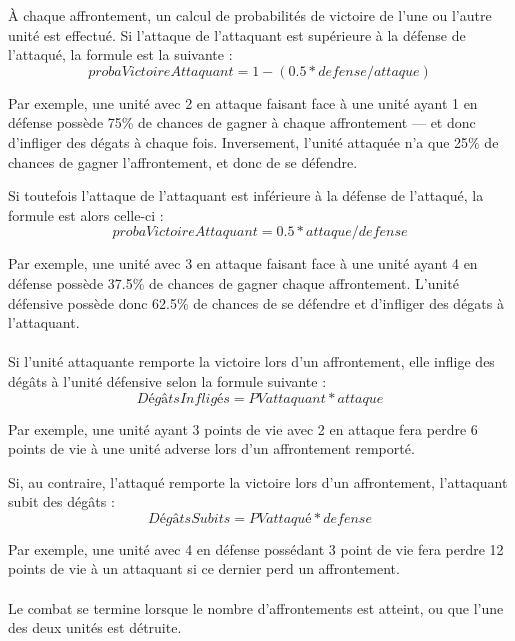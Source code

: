 	À chaque affrontement, un calcul de probabilités de victoire de l'une ou l'autre unité est effectué. Si l'attaque de l'attaquant est supérieure à la défense de l'attaqué, la formule est la suivante :
	\[ probaVictoireAttaquant = 1-(0.5*defense/attaque) \]
	
	Par exemple, une unité avec 2 en attaque faisant face à une unité ayant 1 en défense possède 75\% de chances de gagner à chaque affrontement --- et donc d'infliger des dégats à chaque fois. Inversement, l'unité attaquée n'a que 25\% de chances de gagner l'affrontement, et donc de se défendre.
	
	Si toutefois l'attaque de l'attaquant est inférieure à la défense de l'attaqué, la formule est alors celle-ci :
	\[ probaVictoireAttaquant = 0.5*attaque/defense \]

	Par exemple, une unité avec 3 en attaque faisant face à une unité ayant 4 en défense possède 37.5\% de chances de gagner chaque affrontement. L'unité défensive possède donc 62.5\% de chances de se défendre et d'infliger des dégats à l'attaquant.
	
	\paragraph{}
	Si l'unité attaquante remporte la victoire lors d'un affrontement, elle inflige des dégâts à l'unité défensive selon la formule suivante :
	\[ DégâtsInfligés = PVattaquant*attaque \]
	
	Par exemple, une unité ayant 3 points de vie avec 2 en attaque fera perdre 6 points de vie à une unité adverse lors d'un affrontement remporté.
	
	Si, au contraire, l'attaqué remporte la victoire lors d'un affrontement, l'attaquant subit des dégâts :
	\[ DégâtsSubits = PVattaqué*defense \]

	Par exemple, une unité avec 4 en défense possédant 3 point de vie fera perdre 12 points de vie à un attaquant si ce dernier perd un affrontement.
	
	\paragraph{}
	Le combat se termine lorsque le nombre d'affrontements est atteint, ou que l'une des deux unités est détruite. 
	
	
	
	

